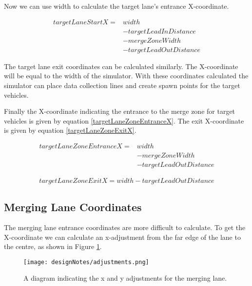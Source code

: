 Now we can use width to calculate the target lane's entrance X-coordinate.

\begin{equation}\label{targetLaneStartX}
	\begin{split}
targetLaneStartX = & width \\
				   & - targetLeadInDistance \\
				   & - mergeZoneWidth \\				
				   & - targetLeadOutDistance	
	\end{split}
\end{equation}

The target lane exit coordinates can be calculated similarly. The X-coordinate will be equal to the width of the simulator. With these coordinates calculated the simulator can place data collection lines and create spawn points for the target vehicles.

Finally the X-coordinate indicating the entrance to the merge zone for target vehicles is given by equation \ref{targetLaneZoneEntranceX}. The exit X-coordinate is given by equation \ref{targetLaneZoneExitX}.

\begin{equation}\label{targetLaneZoneEntranceX}
	\begin{split}
targetLaneZoneEntranceX = & width \\
						  & - mergeZoneWidth \\
						  & - targetLeadOutDistance
	\end{split}
\end{equation}

\begin{equation}\label{targetLaneZoneExitX}
	\begin{split}
targetLaneZoneExitX = width - targetLeadOutDistance
	\end{split}
\end{equation}

\subsection{Merging Lane Coordinates}
\label{subsec:Merging Lane Coordinates}
The merging lane entrance coordinates are more difficult to calculate. To get the X-coordinate we can calculate an x-adjustment from the far edge of the lane to the centre, as shown in Figure \ref{fig:adjustments}.

\begin{figure}[htb]
\centering
\texttt{[image: designNotes/adjustments.png]}
\caption{A diagram indicating the x and y adjustments for the merging lane.}
\label{fig:adjustments}
\end{figure}

